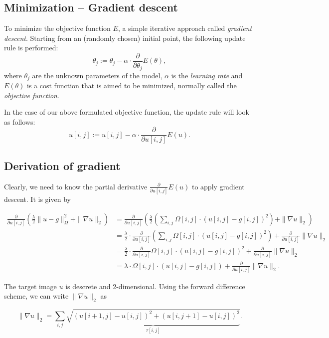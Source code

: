 \documentclass{paper}
\begin{document}
\subsection*{Minimization -- Gradient descent}
To minimize the objective function $E$, a simple iterative approach called \emph{gradient descent}. Starting from an (randomly chosen)  initial point, the following update rule is performed:
\begin{equation}
\theta_j := \theta_j - \alpha \cdot \frac{\partial}{\partial \theta_j} E(\theta),
\label{eq:update-rule}
\end{equation}
where $\theta_j$ are the unknown parameters of the model, $\alpha$ is the \emph{learning rate} and $E(\theta)$ is a cost function that is aimed to be minimized, normally called the \emph{objective function}.

In the case of our above formulated objective function, the update rule will look as follows:
$$ u[i,j] := u[i,j] - \alpha \cdot \frac{\partial}{\partial u[i,j]} E(u).$$
\subsection*{Derivation of gradient}
Clearly, we need to know the partial derivative $\frac{\partial}{\partial u[i,j]} E(u)$ to apply gradient descent. It is given by

\begin{align*}
 \frac{\partial}{\partial u[i,j]} \left( \frac{\lambda}{2} \|u-g\|_\Omega^2 + \|\nabla u\|_2 \right) &= \frac{\partial}{\partial u[i,j]} \left( \frac{\lambda}{2} \left(\sum_{i,j} \Omega[i,j] \cdot (u[i,j] - g[i,j])^2\right) + \|\nabla u\|_2 \right) \\
&= \frac{\lambda}{2} \cdot \frac{\partial}{\partial u[i,j]} \left(\sum_{i,j} \Omega[i,j] \cdot (u[i,j] - g[i,j])^2\right) + \frac{\partial}{\partial u[i,j]} \|\nabla u \|_2 \\
%
&= \frac{\lambda}{2} \cdot \frac{\partial}{\partial u[i,j]} \Omega[i,j] \cdot (u[i,j] - g[i,j])^2 + \frac{\partial}{\partial u[i,j]} \|\nabla u \|_2 \\
%
&= \lambda \cdot \Omega[i,j] \cdot (u[i,j] - g[i,j]) + \frac{\partial}{\partial u[i,j]} \|\nabla u \|_2. 
\end{align*}

The target image $u$ is descrete and 2-dimensional. Using the forward difference scheme, we can write $\|\nabla u \|_2$ as

\begin{equation} \|\nabla u \|_2 = \sum_{i,j} \underbrace{\sqrt{(u[i+1,j] - u [i,j])^2 + (u[i,j+1] - u[i,j])^2}}_{\tau[i,j]}.
 \label{eq:grad}
\end{equation}
\end{document}
